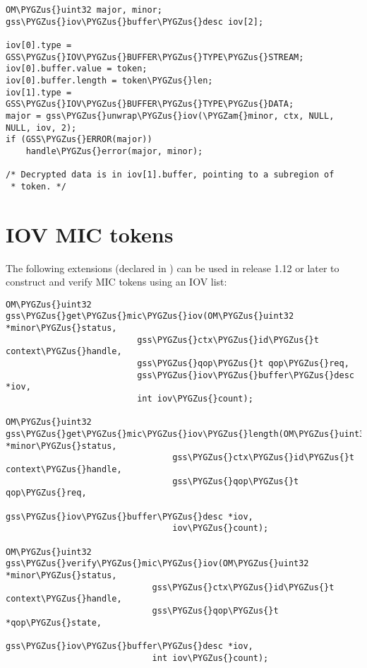\documentclass[letterpaper,10pt,english]{sphinxmanual}
\def\PYGZus{\char`\_}
\def\PYGZam{\char`\&}
\begin{document}
\begin{Verbatim}[commandchars=\\\{\}]
OM\PYGZus{}uint32 major, minor;
gss\PYGZus{}iov\PYGZus{}buffer\PYGZus{}desc iov[2];

iov[0].type = GSS\PYGZus{}IOV\PYGZus{}BUFFER\PYGZus{}TYPE\PYGZus{}STREAM;
iov[0].buffer.value = token;
iov[0].buffer.length = token\PYGZus{}len;
iov[1].type = GSS\PYGZus{}IOV\PYGZus{}BUFFER\PYGZus{}TYPE\PYGZus{}DATA;
major = gss\PYGZus{}unwrap\PYGZus{}iov(\PYGZam{}minor, ctx, NULL, NULL, iov, 2);
if (GSS\PYGZus{}ERROR(major))
    handle\PYGZus{}error(major, minor);

/* Decrypted data is in iov[1].buffer, pointing to a subregion of
 * token. */
\end{Verbatim}


\section{IOV MIC tokens}
\label{appdev/gssapi:gssapi-mic-token}\label{appdev/gssapi:iov-mic-tokens}
The following extensions (declared in ) can
be used in release 1.12 or later to construct and verify MIC tokens
using an IOV list:

\begin{Verbatim}[commandchars=\\\{\}]
OM\PYGZus{}uint32 gss\PYGZus{}get\PYGZus{}mic\PYGZus{}iov(OM\PYGZus{}uint32 *minor\PYGZus{}status,
                          gss\PYGZus{}ctx\PYGZus{}id\PYGZus{}t context\PYGZus{}handle,
                          gss\PYGZus{}qop\PYGZus{}t qop\PYGZus{}req,
                          gss\PYGZus{}iov\PYGZus{}buffer\PYGZus{}desc *iov,
                          int iov\PYGZus{}count);

OM\PYGZus{}uint32 gss\PYGZus{}get\PYGZus{}mic\PYGZus{}iov\PYGZus{}length(OM\PYGZus{}uint32 *minor\PYGZus{}status,
                                 gss\PYGZus{}ctx\PYGZus{}id\PYGZus{}t context\PYGZus{}handle,
                                 gss\PYGZus{}qop\PYGZus{}t qop\PYGZus{}req,
                                 gss\PYGZus{}iov\PYGZus{}buffer\PYGZus{}desc *iov,
                                 iov\PYGZus{}count);

OM\PYGZus{}uint32 gss\PYGZus{}verify\PYGZus{}mic\PYGZus{}iov(OM\PYGZus{}uint32 *minor\PYGZus{}status,
                             gss\PYGZus{}ctx\PYGZus{}id\PYGZus{}t context\PYGZus{}handle,
                             gss\PYGZus{}qop\PYGZus{}t *qop\PYGZus{}state,
                             gss\PYGZus{}iov\PYGZus{}buffer\PYGZus{}desc *iov,
                             int iov\PYGZus{}count);
\end{Verbatim}
\end{document}
